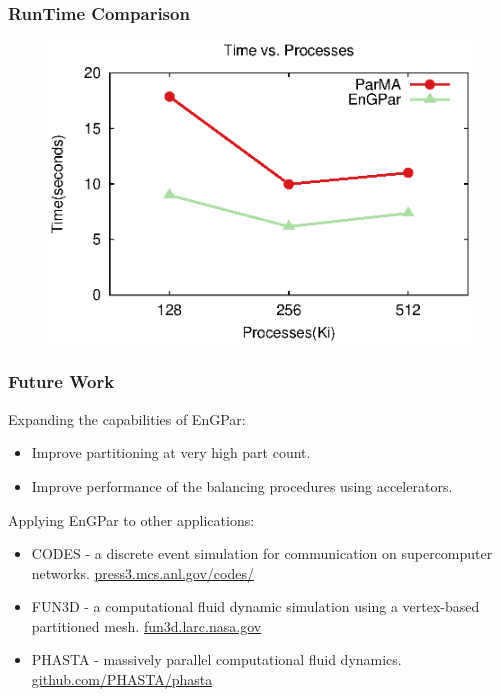 \documentclass{beamer}
\begin{document}
\begin{frame}
  \frametitle{RunTime Comparison}
  \begin{figure}
    \centering
    \includegraphics[width=.8\textwidth]{figures/time_v_cores.eps}
  \end{figure}
  
\end{frame}

\begin{frame}
  \frametitle{Future Work}
  Expanding the capabilities of EnGPar:
  \begin{itemize}
  \item Improve partitioning at very high part count.
  \item Improve performance of the balancing procedures using accelerators.
  \end{itemize}
  Applying EnGPar to other applications:
  \begin{itemize}
  \item CODES - a discrete event simulation for communication on supercomputer networks. \url{press3.mcs.anl.gov/codes/}
  \item FUN3D - a computational fluid dynamic simulation using a vertex-based partitioned mesh. \url{fun3d.larc.nasa.gov}
  \item PHASTA - massively parallel computational fluid dynamics. \url{github.com/PHASTA/phasta}

  \end{itemize}
\end{frame}
  
\end{document}
